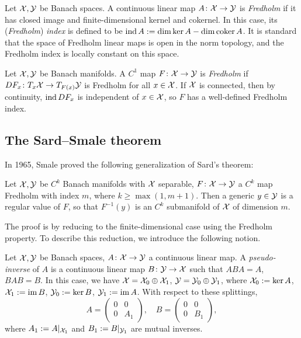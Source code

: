 Let ${\mathcal{X}}, {\mathcal{Y}}$ be Banach spaces. 
A continuous linear map $A \colon {\mathcal{X}} \to {\mathcal{Y}}$ is \textit{Fredholm} 
if it has closed image and finite-dimensional kernel and cokernel. 
In this case, its (\textit{Fredholm}) \textit{index} is defined to be 
$\operatorname{ind} A := \dim \ker A - \dim \operatorname{coker} A$. 
It is standard that the space of 
Fredholm linear maps is open in the norm topology, and 
the Fredholm index is locally constant on this space.

Let ${\mathcal{X}} ,{\mathcal{Y}}$ be Banach manifolds. 
A $C^1$ map $F \colon {\mathcal{X}} \to {\mathcal{Y}}$ is \textit{Fredholm} if 
$DF_x \colon T_x {\mathcal{X}} \to T_{F(x)} {\mathcal{Y}}$ is Fredholm for all $x \in {\mathcal{X}}$. 
If ${\mathcal{X}}$ is connected, then by continuity, $\operatorname{ind} DF_x$ is independent 
of $x \in {\mathcal{X}}$, so $F$ has a well-defined Fredholm index.

\subsection{The Sard--Smale theorem}
In 1965, Smale \cite{Sma} proved the following 
generalization of Sard's theorem:

\begin{theorem}
	Let ${\mathcal{X}}, {\mathcal{Y}}$ be $C^k$ Banach manifolds with ${\mathcal{X}}$ separable, 
	$F \colon {\mathcal{X}} \to {\mathcal{Y}}$ a $C^k$ map Fredholm with index $m$, 
	where $k \geq \max (1, m+1)$. 
	Then a generic $y \in {\mathcal{Y}}$ is a regular value of $F$, 
	so that $F^{-1} (y)$ is an $C^k$ submanifold of ${\mathcal{X}}$ 
	of dimension $m$.
\end{theorem}

The proof is by reducing to the finite-dimensional case 
using the Fredholm property. 
To describe this reduction, we introduce the following notion.

Let ${\mathcal{X}}, {\mathcal{Y}}$ be Banach spaces, 
$A \colon {\mathcal{X}} \to {\mathcal{Y}}$ a continuous linear map. 
A \textit{pseudo-inverse} of $A$ is a continuous linear map 
$B \colon {\mathcal{Y}} \to {\mathcal{X}}$ such that $ABA = A$, $BAB = B$. 
In this case, we have 
${\mathcal{X}} = {\mathcal{X}}_0 \oplus {\mathcal{X}}_1$, 
${\mathcal{Y}} = {\mathcal{Y}}_0 \oplus {\mathcal{Y}}_1$, 
where 
${\mathcal{X}}_0 := \ker A$, ${\mathcal{X}}_1 := \operatorname{im} B$, 
${\mathcal{Y}}_0 := \ker B$, ${\mathcal{Y}}_1 := \operatorname{im} A$. 
With respect to these splittings,
\[
	A = 
		\begin{pmatrix}
			0 & 0 \\
			0 & A_1
		\end{pmatrix},
	\quad 
	B = 
		\begin{pmatrix}
			0 & 0 \\
			0 & B_1
		\end{pmatrix},
\]
where $A_1 := A |_{{\mathcal{X}}_1}$ and $B_1 := B |_{{\mathcal{Y}}_1}$ 
are mutual inverses.


